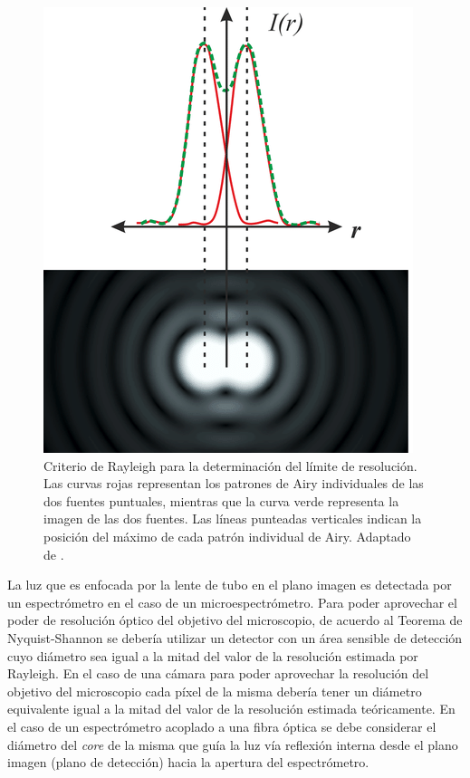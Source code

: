 \begin{figure}[H]
	\centering
	\includegraphics[scale=1.0]{Figs/microespectrometro/raylspa.png}
	\caption{Criterio de Rayleigh para la determinación del límite de resolución. Las curvas rojas representan los patrones de Airy individuales de las dos fuentes puntuales, mientras que la curva verde representa la imagen de las dos fuentes. Las líneas punteadas verticales indican la posición del máximo de cada patrón individual de Airy. Adaptado de \cite{raylsp}.}
	\label{fig:critrayspa}
\end{figure}

La luz que es enfocada por la lente de tubo en el plano imagen es detectada por un espectrómetro en el caso de un microespectrómetro. Para poder aprovechar el poder de resolución óptico del objetivo del microscopio, de acuerdo al Teorema de Nyquist-Shannon se debería utilizar un detector con un área sensible de detección cuyo diámetro sea igual a la mitad del valor de la resolución estimada por Rayleigh. En el caso de una cámara para poder aprovechar la resolución del objetivo del microscopio cada píxel de la misma debería tener un diámetro equivalente igual a la mitad del valor de la resolución estimada teóricamente. En el caso de un espectrómetro acoplado a una fibra óptica se debe considerar el diámetro del \textit{core} de la misma que guía la luz vía reflexión interna desde el plano imagen (plano de detección) hacia la apertura del espectrómetro.

